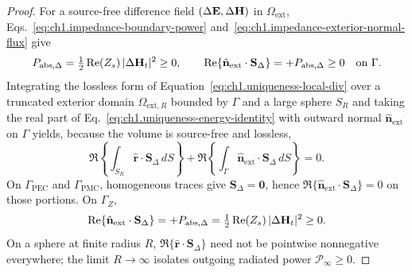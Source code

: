 \begin{proof}
For a source-free difference field $(\Delta\mathbf{E},\Delta\mathbf{H})$ in $\Omega_{\mathrm{ext}}$, Eqs.~\eqref{eq:ch1.impedance-boundary-power} and~\eqref{eq:ch1.impedance-exterior-normal-flux} give
\[
P_{\mathrm{abs},\Delta}
=\tfrac12\Re(Z_s)\,|\Delta\mathbf{H}_t|^{2}\ge 0,
\qquad
\Re\!\left\{\hat{\mathbf{n}}_{\mathrm{ext}}\cdot\mathbf{S}_\Delta\right\}
=+P_{\mathrm{abs},\Delta}\ge 0
\quad\text{on }\Gamma.
\]
Integrating the lossless form of Equation~\eqref{eq:ch1.uniqueness-local-div} over a truncated exterior domain $\Omega_{\mathrm{ext},R}$ bounded by $\Gamma$ and a large sphere $S_R$ and taking the real part of Eq.~\eqref{eq:ch1.uniqueness-energy-identity} with outward normal $\hat{\mathbf{n}}_{\mathrm{ext}}$ on $\Gamma$ yields, because the volume is source-free and lossless,
\begin{equation}
\label{eq:ch1.exterior-difference-energy-balance}
\Re\!\left\{\int_{S_R}\hat{\mathbf{r}}\cdot\mathbf{S}_\Delta\,dS\right\}
+\Re\!\left\{\int_{\Gamma}\hat{\mathbf{n}}_{\mathrm{ext}}\cdot\mathbf{S}_\Delta\,dS\right\}=0.
\end{equation}
On $\Gamma_{\mathrm{PEC}}$ and $\Gamma_{\mathrm{PMC}}$, homogeneous traces give $\mathbf{S}_\Delta=\mathbf{0}$, hence $\Re\{\hat{\mathbf{n}}_{\mathrm{ext}}\cdot\mathbf{S}_\Delta\}=0$ on those portions. On $\Gamma_Z$,
\[
\Re\!\left\{\hat{\mathbf{n}}_{\mathrm{ext}}\cdot\mathbf{S}_\Delta\right\}
=+P_{\mathrm{abs},\Delta}
=\tfrac12\Re(Z_s)\,|\Delta\mathbf{H}_t|^{2}\ge 0.
\]
On a sphere at finite radius $R$, $\Re\{\hat{\mathbf{r}}\cdot\mathbf{S}_\Delta\}$ need not be pointwise nonnegative everywhere; the limit $R\to\infty$ isolates outgoing radiated power $\mathcal{P}_\infty\ge 0$.


\end{proof}
